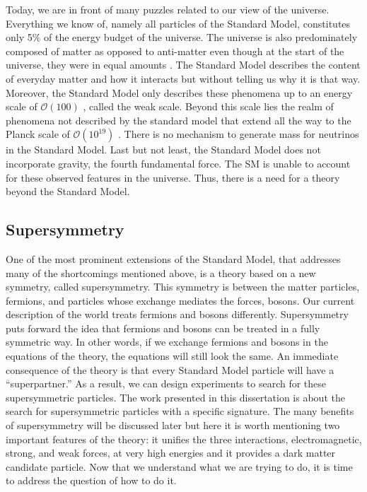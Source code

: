 Today, we are in front of many puzzles related to our view of the universe.
Everything we know of, namely all particles of the Standard Model, 
constitutes only 5\% of the energy budget of the universe. 
The universe is also predominately composed of matter as opposed to 
anti-matter even though at the start of the universe, they were in equal 
amounts%
. The Standard Model describes the content of 
everyday matter 
and how it interacts but without telling us why it is that way.
Moreover, the Standard Model only describes these phenomena 
up to an energy scale of $\mathcal{O}\left(100\right)$ \GeV, called the weak scale.
Beyond this scale lies the realm of phenomena not described by the standard 
model that extend all the way to the Planck scale of 
$\mathcal{O}\left(10^{19}\right)$ \GeV. There is no mechanism to generate mass for 
neutrinos in the Standard Model. Last but not least, the Standard Model 
does not incorporate gravity, the fourth fundamental force.
The SM is unable to account for these observed 
features in the universe. 
Thus, there is a need for a theory beyond the Standard Model.

\subsection*{Supersymmetry}

One of the most prominent extensions of the Standard Model, 
that addresses many of the shortcomings mentioned above, is a theory based on 
a new symmetry, called supersymmetry.
This symmetry is between the matter particles, fermions, and particles whose
exchange mediates the forces, bosons. Our current description of the world
treats fermions and bosons differently. Supersymmetry puts forward the idea
that fermions and bosons can be treated in a fully symmetric way. 
In other words,
if we exchange fermions and bosons in the equations of the theory, the 
equations will still look the same. An immediate consequence of the theory
is that every Standard Model particle will have a ``superpartner.''
As a result, we can design experiments to search for these 
supersymmetric particles. The work presented in this dissertation is about the search for supersymmetric particles with a specific signature.
The many benefits of supersymmetry will be discussed later but here it is worth 
mentioning two important features of the theory: 
it unifies the three interactions, electromagnetic, strong, and weak forces,
at very high energies 
and it provides a dark matter candidate particle. Now that we understand 
what we are trying to do, it is time to address the question of how to do it.


